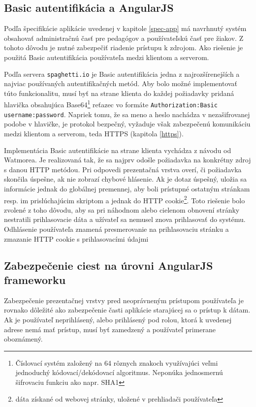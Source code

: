 \documentclass[12pt,oneside]{fithesis2}
\begin{document}
      		\subsection{Basic autentifikácia a AngularJS}
      		\par Podľa špecifikácie aplikácie uvedenej v kapitole \ref{spec-app} má navrhnutý systém obsahovať administračnú časť pre pedagógov a používateľskú časť pre žiakov. Z tohoto dôvodu je nutné zabezpečiť riadenie prístupu k zdrojom. Ako riešenie je použitá Basic autentifikácia používateľa medzi klientom a serverom.
      		\par Podľa servera \texttt{spaghetti.io}\cite{spaghetti14} je Basic autentifikácia jedna z najrozšírenejších a najviac používaných autentifikačných metód. Aby bolo možné implementovať túto funkcionalitu, musí byť na strane klienta do každej požiadavky pridaná hlavička obsahujúca Base64\footnote{Číslovací systém založený na 64 rôznych znakoch využívajúci veľmi jednoduchý kódovací/dekódovací algoritmus. Neponúka jednosmernú šifrovaciu funkciu ako napr. SHA1} reťazec vo formáte \texttt{Authorization:Basic username:password}. Napriek tomu, že sa meno a heslo nachádza v nezašifrovanej podobe v hlavičke, je protokol bezpečný, vyžaduje však zabezpečenú komunikáciu medzi klientom a serverom, teda HTTPS (kapitola \ref{https}). 
      		\par Implementácia Basic autentifikácie na strane klienta vychádza z návodu od Watmorea\cite{watmore14}. Je realizovaná tak, že sa najprv odošle požiadavka na konkrétny zdroj s danou HTTP metódou. Pri odpovedi prezentačná vrstva overí, či požiadavka skončila úspešne, ak nie zobrazí chybové hlásenie. Ak je dotaz úspešný, uložia sa informácie jednak do globálnej premennej, aby boli prístupné ostatným stránkam resp. im prislúchajúcim skriptom a jednak do HTTP cookie\footnote{dáta získané od webovej stránky, uložené v prehliadači používateľa}. Toto riešenie bolo zvolené z toho dôvodu, aby sa pri náhodnom alebo cielenom obnovení stránky nestratili prihlasovacie dáta a užívateľ sa nemusel znova prihlasovať do systému. Odhlásenie používateľa znamená presmerovanie na prihlasovaciu stránku a zmazanie HTTP cookie s prihlasovacími údajmi
      		
      		\subsection{Zabezpečenie ciest na úrovni AngularJS frameworku}
      		\par Zabezpečenie prezentačnej vrstvy pred neoprávneným prístupom používateľa je rovnako dôležité ako zabezpečenie časti aplikácie starajúcej sa o prístup k dátam. Ak je používateľ neprihlásený, alebo prihlásený pod rolou, ktorá k uvedenej adrese nemá mať prístup, musí byť zamedzený a používateľ primerane oboznámený.
      		\par 
      		
\end{document}
